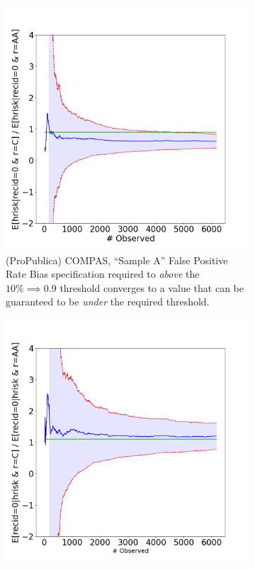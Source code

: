 \begin{figure}
    \begin{subfigure}{0.48\linewidth}
        \centering
        \includegraphics[width=\linewidth]{avoir/images/compas-propublica-et.png}
        \caption{(ProPublica) COMPAS, ``Sample A'' False Positive Rate Bias specification required to \emph{above} the $10\% \implies 0.9$ threshold converges to a value that can be guaranteed to be \emph{under} the required threshold.}
        \label{fig:casestudy:compas:propublica}
    \end{subfigure}
    \hfill
    \begin{subfigure}{0.48\linewidth}
        \centering
        \includegraphics[width=\linewidth]{avoir/images/compas-northpointe-et.png}

\end{subfigure}
\end{figure}
